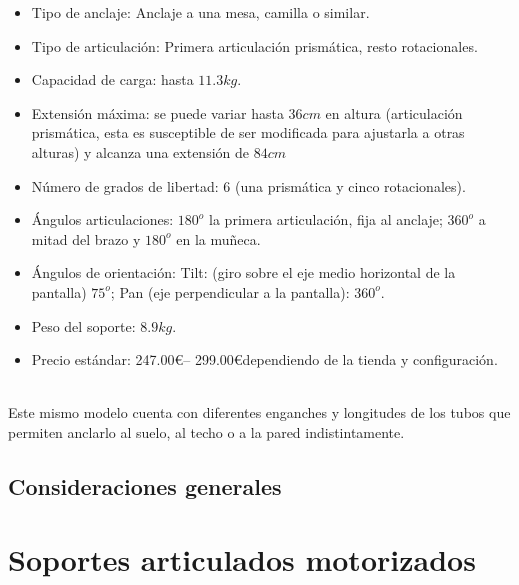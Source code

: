  \begin{minipage}{0.65\textwidth}\raggedright
 	\hspace{1cm}
 	\begin{itemize}
 		\item Tipo de anclaje: Anclaje a una mesa, camilla o similar.
 		\item Tipo de articulación: Primera articulación prismática, resto rotacionales.
 		\item Capacidad de carga: hasta $11.3kg$.
 		\item Extensión máxima: se puede variar hasta $36cm$ en altura (articulación prismática, esta es susceptible de ser modificada para ajustarla a otras alturas) y alcanza una extensión de $84cm$
 		\item Número de grados de libertad: 6 (una prismática y cinco rotacionales).
 		\item Ángulos articulaciones: $180^o$ la primera articulación, fija al anclaje; $360^o$ a mitad del brazo y $180^o$ en la muñeca.
 		\item Ángulos de orientación: Tilt: (giro sobre el eje medio horizontal de la pantalla) $75^o$; Pan (eje perpendicular a la pantalla): $360^o$.
 		\item Peso del soporte: $8.9kg$.
 		\item Precio estándar: 247.00\euro – 299.00\euro dependiendo de la tienda y configuración.
 	\end{itemize}
 \end{minipage}
 \\ 
 
 \vspace{0.1cm} 
 Este mismo modelo cuenta con diferentes enganches y longitudes de los tubos que permiten anclarlo al suelo, al techo o a la pared indistintamente.
 
 \subsection{Consideraciones generales}

\section{Soportes articulados motorizados}